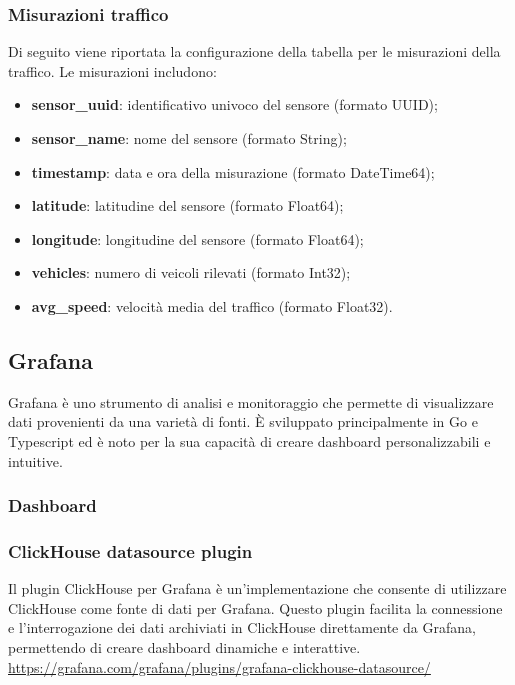 \subsubsection{Misurazioni traffico}
Di seguito viene riportata la configurazione della tabella per le misurazioni della traffico. Le misurazioni includono:
\begin{itemize}
	\item \textbf{sensor\_uuid}: identificativo univoco del sensore (formato UUID);
	\item \textbf{sensor\_name}: nome del sensore (formato String);
	\item \textbf{timestamp}: data e ora della misurazione (formato DateTime64);
	\item \textbf{latitude}: latitudine del sensore (formato Float64);
	\item \textbf{longitude}: longitudine del sensore (formato Float64);
	\item \textbf{vehicles}: numero di veicoli rilevati (formato Int32);
	\item \textbf{avg\_speed}: velocità media del traffico (formato Float32).
\end{itemize}
\subsection{Grafana}
Grafana è uno strumento di analisi e monitoraggio che permette di visualizzare dati provenienti da una varietà di fonti. È sviluppato principalmente in Go e Typescript ed è noto per la sua capacità di creare dashboard personalizzabili e intuitive.
\subsubsection{Dashboard}

\subsubsection{ClickHouse datasource plugin}
Il plugin ClickHouse per Grafana è un'implementazione che consente di utilizzare ClickHouse come fonte di dati per Grafana. Questo plugin facilita la connessione e l'interrogazione dei dati archiviati in ClickHouse direttamente da Grafana, permettendo di creare dashboard dinamiche e interattive.
\url{https://grafana.com/grafana/plugins/grafana-clickhouse-datasource/}


